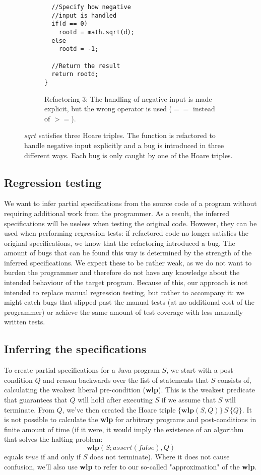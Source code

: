 \documentclass[a4paper, fleqn]{article}
\newcommand{\wlp}{\textbf{wlp}\xspace}
\begin{document}
\begin{figure}
\begin{subfigure}{.47\textwidth}
\begin{lstlisting}
  //Specify how negative 
  //input is handled
  if(d == 0)
    rootd = math.sqrt(d);
  else
    rootd = -1;

  //Return the result
  return rootd;
}
\end{lstlisting}
\caption{Refactoring 3: The handling of negative input is made explicit, but the wrong operator is used ($==$ instead of $>=$).}
\end{subfigure}
\caption{$sqrt$ satisfies three Hoare triples. The function is refactored to handle negative input explicitly and a bug is introduced in three different ways. Each bug is only caught by one of the Hoare triples.}
\label{3 mutations}
\end{figure}

\subsection{Regression testing}
We want to infer partial specifications from the source code of a program without requiring additional work from the programmer. As a result, the inferred specifications will be useless when testing the original code. However, they can be used when performing regression tests: if refactored code no longer satisfies the original specifications, we know that the refactoring introduced a bug. The amount of bugs that can be found this way is determined by the strength of the inferred specifications. We expect these to be rather weak, as we do not want to burden the programmer and therefore do not have any knowledge about the intended behaviour of the target program. Because of this, our approach is not intended to replace manual regression testing, but rather to accompany it: we might catch bugs that slipped past the manual tests (at no additional cost of the programmer) or achieve the same amount of test coverage with less manually written tests.

\subsection{Inferring the specifications}
To create partial specifications for a Java program $S$, we start with a post-condition $Q$ and reason backwards over the list of statements that $S$ consists of, calculating the weakest liberal pre-condition (\wlp). This is the weakest predicate that guarantees that $Q$ will hold after executing $S$ if we assume that $S$ will terminate. From $Q$, we've then created the Hoare triple $ \{\wlp(S, Q)\}\,S\, \{Q\}$. It is not possible to calculate the \wlp for arbitrary programs and post-conditions in finite amount of time (if it were, it would imply the existence of an algorithm that solves the halting problem: \[\wlp(S;assert(false), Q)\] equals $true$ if and only if $S$ does not terminate). Where it does not cause confusion, we'll also use \wlp to refer to our so-called "approximation" of the \wlp.
\end{document}
